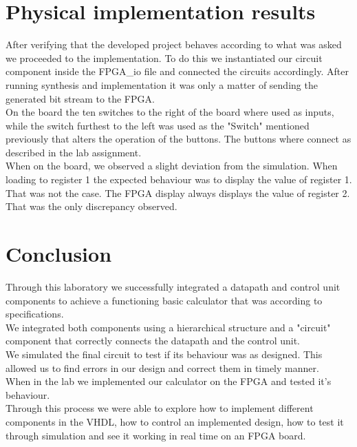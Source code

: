\documentclass[12pt]{article}
\begin{document}
\section{Physical implementation results}

After verifying that the developed project behaves according to what was asked we proceeded to the implementation.
To do this we instantiated our circuit component inside the FPGA\_io file and connected the circuits accordingly. After running synthesis and implementation it was only a matter of sending the generated bit stream to the FPGA.\\

On the board the ten switches to the right of the board where used as inputs, while the switch furthest to the left was used as the "Switch" mentioned previously that alters the operation of the buttons. The buttons where connect as described in the lab assignment.\\

When on the board, we observed a slight deviation from the simulation. When loading to register 1 the expected behaviour was to display the value of register 1. That was not the case. The FPGA display always displays the value of register 2. That was the only discrepancy observed.

\section{Conclusion}

Through this laboratory we successfully integrated a datapath and control unit components to achieve a functioning basic calculator that was according to specifications.\\

We integrated both components using a hierarchical structure and a "circuit" component that correctly connects the datapath and the control unit.\\

We simulated the final circuit to test if its behaviour was as designed. This allowed us to find errors in our design and correct them in timely manner.\\

When in the lab we implemented our calculator on the FPGA and tested it's behaviour.\\

Through this process we were able to explore how to implement different components in the VHDL, how to control an implemented design, how to test it through simulation and see it working in real time on an FPGA board.
\end{document}
